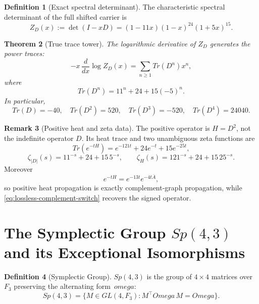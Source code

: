 \documentclass[12pt,a4paper]{article}
\def\mathbb#1{#1}%
\def\mathrm#1{#1}%
\def\omega{omega}%
\def\Omega{Omega}%
\newtheorem{theorem}{Theorem}[section]
\theoremstyle{definition}
\newtheorem{definition}[theorem]{Definition}
\newtheorem{remark}[theorem]{Remark}
\newcommand{\Sp}{\mathrm{Sp}}
\renewcommand{\Tr}{\mathrm{Tr}}
\newcommand{\FF}{\mathbb{F}}
\begin{document}
\begin{definition}[Exact spectral determinant]
The characteristic spectral determinant of the full shifted carrier is
\begin{equation}\label{eq:Zdef}
  Z_D(x):=\det(I-xD)=(1-11x)(1-x)^{24}(1+5x)^{15}.
\end{equation}
\end{definition}

\begin{theorem}[True trace tower]\label{thm:trace-tower}
The logarithmic derivative of $Z_D$ generates the power traces:
\begin{equation}\label{eq:trace-gen}
  -x\,\frac{d}{dx}\log Z_D(x)
  =\sum_{n\ge1}\Tr(D^n)x^n,
\end{equation}
where
\begin{equation}\label{eq:trace-formula}
  \boxed{\Tr(D^n)=11^n+24+15(-5)^n.}
\end{equation}
In particular,
\[
  \Tr(D)=-40,\quad
  \Tr(D^2)=520,\quad
  \Tr(D^3)=-520,\quad
  \Tr(D^4)=24040.
\]
\end{theorem}

\begin{remark}[Positive heat and zeta data]
The positive operator is $H=D^2$, not the indefinite operator $D$.
Its heat trace and two unambiguous zeta functions are
\[
\Tr(e^{-tH})=e^{-121t}+24e^{-t}+15e^{-25t},
\]
\[
\zeta_{|D|}(s)=11^{-s}+24+15\,5^{-s},\qquad
\zeta_H(s)=121^{-s}+24+15\,25^{-s}.
\]
Moreover
\[
e^{-tH}=e^{-13t}e^{-4t\overline A},
\]
so positive heat propagation is exactly complement-graph propagation,
while \eqref{eq:lossless-complement-switch} recovers the signed operator.
\end{remark}


\section{\texorpdfstring{The Symplectic Group $\Sp(4,3)$ and its Exceptional Isomorphisms}{The Symplectic Group Sp(4,3) and its Exceptional Isomorphisms}}
\label{sec:sp}

\begin{definition}[Symplectic Group]
$\Sp(4,3)$ is the group of $4\times 4$ matrices over $\FF_3$
preserving the alternating form~$\omega$:
\begin{equation}
\Sp(4,3) = \{M\in\mathrm{GL}(4,\FF_3) : M^\top\Omega\,M = \Omega\}.
\end{equation}
\end{definition}
\end{document}
